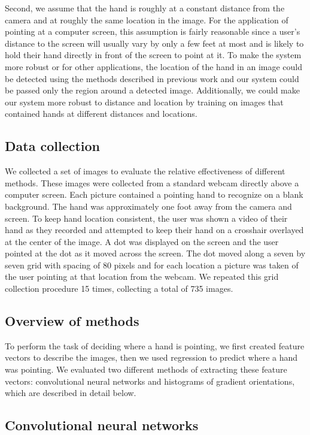 \documentclass[10pt,twocolumn,letterpaper]{article}
\begin{document}
Second, we assume that the hand is roughly at a constant distance from the camera and at roughly the same location in the image.  For the application of pointing at a computer screen, this assumption is fairly reasonable since a user's distance to the screen will usually vary by only a few feet at most and is likely to hold their hand directly in front of the screen to point at it.  To make the system more robust or for other applications, the location of the hand in an image could be detected using the methods described in previous work and our system could be passed only the region around a detected image.  Additionally, we could make our system more robust to distance and location by training on images that contained hands at different distances and locations.

\subsection{Data collection}

We collected a set of images to evaluate the relative effectiveness of different methods.  These images were collected from a standard webcam directly above a computer screen.  Each picture contained a pointing hand to recognize on a blank background.  The hand was approximately one foot away from the camera and screen.  To keep hand location consistent, the user was shown a video of their hand as they recorded and attempted to keep their hand on a crosshair overlayed at the center of the image.  A dot was displayed on the screen and the user pointed at the dot as it moved across the screen.  The dot moved along a seven by seven grid with spacing of 80 pixels and for each location a picture was taken of the user pointing at that location from the webcam.  We repeated this grid collection procedure 15 times, collecting a total of 735 images.


\subsection{Overview of methods}

To perform the task of deciding where a hand is pointing, we first created feature vectors to describe the images, then we used regression to predict where a hand was pointing.  We evaluated two different methods of extracting these feature vectors: convolutional neural networks and histograms of gradient orientations, which are described in detail below.

\subsection{Convolutional neural networks}
\end{document}
